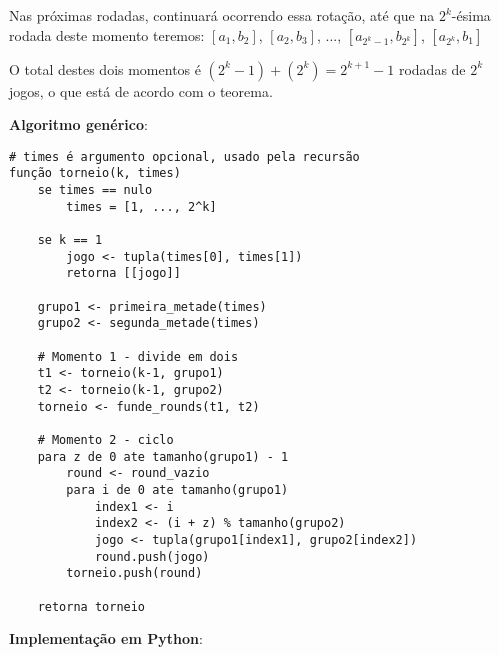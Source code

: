 Nas próximas rodadas, continuará ocorrendo essa rotação, até que na $2^k$-ésima rodada deste momento teremos: $[a_1, b_2]$, $[a_2, b_3]$, ..., $[a_{2^k-1}, b_{2^k}]$, $[a_{2^k}, b_1]$

O total destes dois momentos é $(2^k -1) + (2^k) = 2^{k+1} - 1$ rodadas de $2^k$ jogos, o que está de acordo com o teorema.


\textbf{Algoritmo genérico}:

{\color{ogreen}
\begin{verbatim}
# times é argumento opcional, usado pela recursão
função torneio(k, times)
    se times == nulo
        times = [1, ..., 2^k]

    se k == 1
        jogo <- tupla(times[0], times[1])
        retorna [[jogo]]

    grupo1 <- primeira_metade(times)
    grupo2 <- segunda_metade(times)

    # Momento 1 - divide em dois
    t1 <- torneio(k-1, grupo1)
    t2 <- torneio(k-1, grupo2)
    torneio <- funde_rounds(t1, t2)

    # Momento 2 - ciclo
    para z de 0 ate tamanho(grupo1) - 1
        round <- round_vazio
        para i de 0 ate tamanho(grupo1)
            index1 <- i
            index2 <- (i + z) % tamanho(grupo2)
            jogo <- tupla(grupo1[index1], grupo2[index2])
            round.push(jogo)
        torneio.push(round)

    retorna torneio
\end{verbatim}
}


\textbf{Implementação em Python}:


